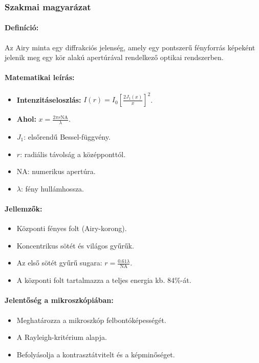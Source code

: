 \documentclass[a4paper,12pt]{article}
\begin{document}
\subsubsection{Szakmai magyarázat}

\paragraph{Definíció:} 
Az Airy minta egy diffrakciós jelenség, amely egy pontszerű fényforrás képeként jelenik meg egy kör alakú apertúrával rendelkező optikai rendszerben.

\paragraph{Matematikai leírás:} 
\begin{itemize}
    \item \textbf{Intenzitáseloszlás:} \( I(r) = I_0 \left[\frac{2J_1(x)}{x}\right]^2 \).
    \item \textbf{Ahol:} \( x = \frac{2\pi r \text{NA}}{\lambda} \).
    \item \( J_1 \): elsőrendű Bessel-függvény.
    \item \( r \): radiális távolság a középponttól.
    \item \( \text{NA} \): numerikus apertúra.
    \item \( \lambda \): fény hullámhossza.
\end{itemize}

\paragraph{Jellemzők:} 
\begin{itemize}
    \item Központi fényes folt (Airy-korong).
    \item Koncentrikus sötét és világos gyűrűk.
    \item Az első sötét gyűrű sugara: \( r = \frac{0.61\lambda}{\text{NA}} \).
    \item A központi folt tartalmazza a teljes energia kb. 84\%-át.
\end{itemize}

\paragraph{Jelentőség a mikroszkópiában:} 
\begin{itemize}
    \item Meghatározza a mikroszkóp felbontóképességét.
    \item A Rayleigh-kritérium alapja.
    \item Befolyásolja a kontrasztátvitelt és a képminőséget.
\end{itemize}
\end{document}
